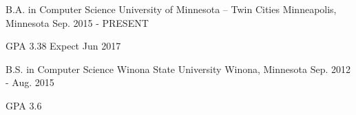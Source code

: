 

\begin{cventries}

  \cventry
    {B.A. in Computer Science} %
    {University of Minnesota -- Twin Cities} %
    {Minneapolis, Minnesota} %
    {Sep. 2015 - PRESENT} %
    {
      \begin{cvitems} %
        \item {GPA 3.38{\enskip\cdotp\enskip} Expect Jun 2017}
      \end{cvitems}
    }

\cventry
    {B.S. in Computer Science} %
    {Winona State University} %
    {Winona, Minnesota} %
    {Sep. 2012 - Aug. 2015} %
    {
      \begin{cvitems} %
        \item {GPA 3.6}
      \end{cvitems}
    }
\end{cventries}
